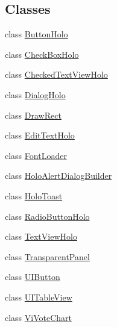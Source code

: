 \subsection*{Classes}
\begin{DoxyCompactItemize}
\item 
class \hyperlink{classcom_1_1zia_1_1freshdocs_1_1widget_1_1_button_holo}{Button\-Holo}
\item 
class \hyperlink{classcom_1_1zia_1_1freshdocs_1_1widget_1_1_check_box_holo}{Check\-Box\-Holo}
\item 
class \hyperlink{classcom_1_1zia_1_1freshdocs_1_1widget_1_1_checked_text_view_holo}{Checked\-Text\-View\-Holo}
\item 
class \hyperlink{classcom_1_1zia_1_1freshdocs_1_1widget_1_1_dialog_holo}{Dialog\-Holo}
\item 
class \hyperlink{classcom_1_1zia_1_1freshdocs_1_1widget_1_1_draw_rect}{Draw\-Rect}
\item 
class \hyperlink{classcom_1_1zia_1_1freshdocs_1_1widget_1_1_edit_text_holo}{Edit\-Text\-Holo}
\item 
class \hyperlink{classcom_1_1zia_1_1freshdocs_1_1widget_1_1_font_loader}{Font\-Loader}
\item 
class \hyperlink{classcom_1_1zia_1_1freshdocs_1_1widget_1_1_holo_alert_dialog_builder}{Holo\-Alert\-Dialog\-Builder}
\item 
class \hyperlink{classcom_1_1zia_1_1freshdocs_1_1widget_1_1_holo_toast}{Holo\-Toast}
\item 
class \hyperlink{classcom_1_1zia_1_1freshdocs_1_1widget_1_1_radio_button_holo}{Radio\-Button\-Holo}
\item 
class \hyperlink{classcom_1_1zia_1_1freshdocs_1_1widget_1_1_text_view_holo}{Text\-View\-Holo}
\item 
class \hyperlink{classcom_1_1zia_1_1freshdocs_1_1widget_1_1_transparent_panel}{Transparent\-Panel}
\item 
class \hyperlink{classcom_1_1zia_1_1freshdocs_1_1widget_1_1_u_i_button}{U\-I\-Button}
\item 
class \hyperlink{classcom_1_1zia_1_1freshdocs_1_1widget_1_1_u_i_table_view}{U\-I\-Table\-View}
\item 
class \hyperlink{classcom_1_1zia_1_1freshdocs_1_1widget_1_1_vi_vote_chart}{Vi\-Vote\-Chart}
\end{DoxyCompactItemize}
